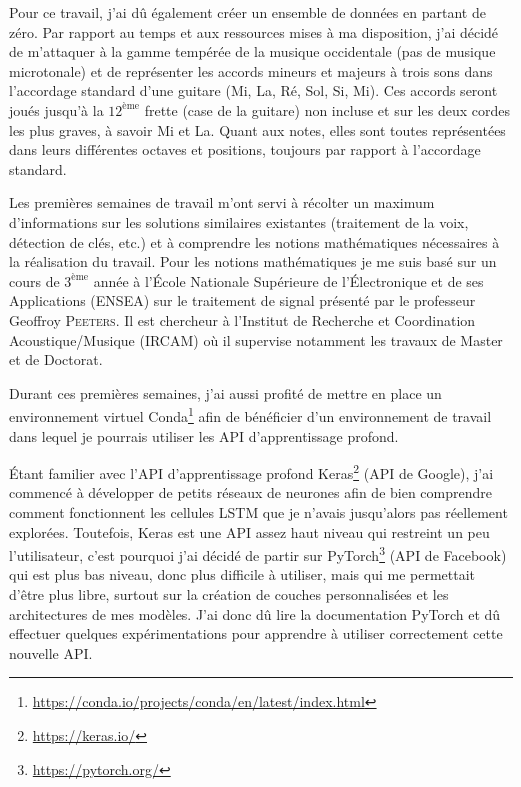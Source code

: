 Pour ce travail, j'ai dû également créer un ensemble de données en partant de zéro. Par rapport au temps et aux ressources mises à ma disposition, j'ai décidé de m'attaquer à la gamme tempérée de la musique occidentale (pas de musique microtonale) et de représenter les accords mineurs et majeurs à trois sons dans l'accordage standard d'une guitare (Mi, La, Ré, Sol, Si, Mi). Ces accords seront joués jusqu'à la $12^{\text{ème}}$ frette (case de la guitare) non incluse et sur les deux cordes les plus graves, à savoir Mi et La. Quant aux notes, elles sont toutes représentées dans leurs différentes octaves et positions, toujours par rapport à l'accordage standard.

Les premières semaines de travail m'ont servi à récolter un maximum d'informations sur les solutions similaires existantes (traitement de la voix, détection de clés, etc.) et à comprendre les notions mathématiques nécessaires à la réalisation du travail. Pour les notions mathématiques je me suis basé sur un cours de $3^{\text{ème}}$ année à l'École Nationale Supérieure de l'Électronique et de ses Applications (ENSEA) sur le traitement de signal \parencite{peeters_ensea_2017} présenté par le professeur Geoffroy \textsc{Peeters}. Il est chercheur à l’Institut de Recherche et Coordination Acoustique/Musique (IRCAM) où il supervise notamment les travaux de Master et de Doctorat.

Durant ces premières semaines, j'ai aussi profité de mettre en place un environnement virtuel Conda\footnote{\url{https://conda.io/projects/conda/en/latest/index.html}} afin de bénéficier d'un environnement de travail dans lequel je pourrais utiliser les API d'apprentissage profond.

Étant familier avec l'API d'apprentissage profond Keras\footnote{\url{https://keras.io/}} (API de Google), j'ai commencé à développer de petits réseaux de neurones afin de bien comprendre comment fonctionnent les cellules LSTM que je n'avais jusqu'alors pas réellement explorées. Toutefois, Keras est une API assez haut niveau qui restreint un peu l'utilisateur, c'est pourquoi j'ai décidé de partir sur PyTorch\footnote{\url{https://pytorch.org/}} (API de Facebook) qui est plus bas niveau, donc plus difficile à utiliser, mais qui me permettait d'être plus libre, surtout sur la création de couches personnalisées et les architectures de mes modèles. J'ai donc dû lire la documentation PyTorch et dû effectuer quelques expérimentations pour apprendre à utiliser correctement cette nouvelle API.

